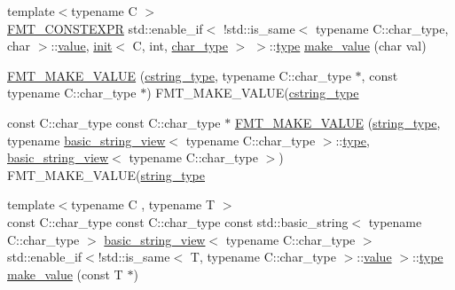 \begin{DoxyCompactItemize}
\item 
{\footnotesize template$<$typename C $>$ }\\\hyperlink{core_8h_a69201cb276383873487bf68b4ef8b4cd}{F\+M\+T\+\_\+\+C\+O\+N\+S\+T\+E\+X\+PR} std\+::enable\+\_\+if$<$ !std\+::is\+\_\+same$<$ typename C\+::char\+\_\+type, char $>$\+::\hyperlink{classinternal_1_1value}{value}, \hyperlink{structinternal_1_1init}{init}$<$ C, int, \hyperlink{namespaceinternal_a8661864098ac0acff9a6dd7e66f59038a57b8984c55996e4117342a9cd2dc313e}{char\+\_\+type} $>$ $>$\+::\hyperlink{namespaceinternal_a8661864098ac0acff9a6dd7e66f59038}{type} \hyperlink{namespaceinternal_ad8fe07e2220b7ad5d8d264cdf5a533ad}{make\+\_\+value} (char val)
\item 
\hyperlink{namespaceinternal_a9a3696389145c4bf6099748c4a2e9380}{F\+M\+T\+\_\+\+M\+A\+K\+E\+\_\+\+V\+A\+L\+UE} (\hyperlink{namespaceinternal_a8661864098ac0acff9a6dd7e66f59038a97e784de660e3e6971e031779c070b62}{cstring\+\_\+type}, typename C\+::char\+\_\+type $\ast$, const typename C\+::char\+\_\+type $\ast$) F\+M\+T\+\_\+\+M\+A\+K\+E\+\_\+\+V\+A\+L\+UE(\hyperlink{namespaceinternal_a8661864098ac0acff9a6dd7e66f59038a97e784de660e3e6971e031779c070b62}{cstring\+\_\+type}
\item 
const C\+::char\+\_\+type const C\+::char\+\_\+type $\ast$ \hyperlink{namespaceinternal_ab35f0ca6e0be6907eea60addbc5428b8}{F\+M\+T\+\_\+\+M\+A\+K\+E\+\_\+\+V\+A\+L\+UE} (\hyperlink{namespaceinternal_a8661864098ac0acff9a6dd7e66f59038a8a104d760e6ea540da0d654ca8728d55}{string\+\_\+type}, typename \hyperlink{classbasic__string__view}{basic\+\_\+string\+\_\+view}$<$ typename C\+::char\+\_\+type $>$\+::\hyperlink{namespaceinternal_a8661864098ac0acff9a6dd7e66f59038}{type}, \hyperlink{classbasic__string__view}{basic\+\_\+string\+\_\+view}$<$ typename C\+::char\+\_\+type $>$) F\+M\+T\+\_\+\+M\+A\+K\+E\+\_\+\+V\+A\+L\+UE(\hyperlink{namespaceinternal_a8661864098ac0acff9a6dd7e66f59038a8a104d760e6ea540da0d654ca8728d55}{string\+\_\+type}
\item 
{\footnotesize template$<$typename C , typename T $>$ }\\const C\+::char\+\_\+type const C\+::char\+\_\+type const std\+::basic\+\_\+string$<$ typename C\+::char\+\_\+type $>$ \hyperlink{classbasic__string__view}{basic\+\_\+string\+\_\+view}$<$ typename C\+::char\+\_\+type $>$ std\+::enable\+\_\+if$<$!std\+::is\+\_\+same$<$ T, typename C\+::char\+\_\+type $>$\+::\hyperlink{classinternal_1_1value}{value} $>$\+::\hyperlink{namespaceinternal_a8661864098ac0acff9a6dd7e66f59038}{type} \hyperlink{namespaceinternal_aa551b02f947d056cac41aa5a530a0176}{make\+\_\+value} (const T $\ast$)

\end{DoxyCompactItemize}

